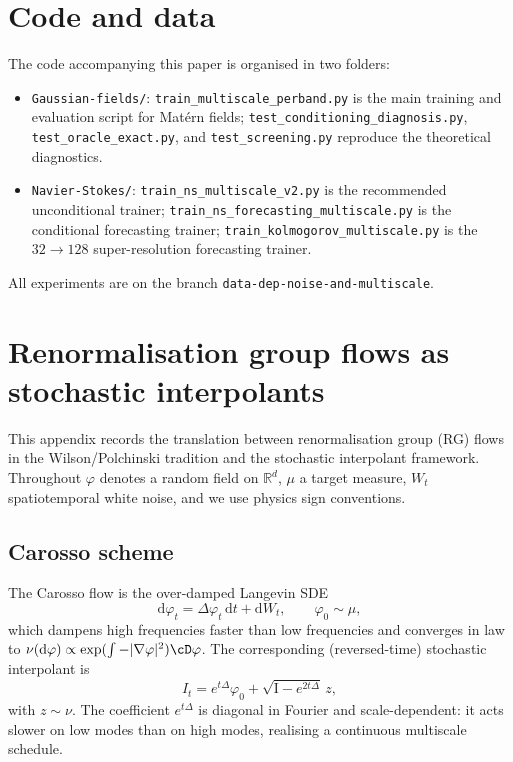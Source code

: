 \documentclass[11pt]{amsart}
\newcommand{\bR}{\mathbb{R}} \newcommand{\bN}{\mathbb{N}}
\newcommand{\rd}{\mathrm{d}}
\theoremstyle{remark}
\numberwithin{equation}{section}
\begin{document}
\section*{Code and data}
The code accompanying this paper is organised in two folders:
\begin{itemize}
\item \texttt{Gaussian-fields/}: \texttt{train\_multiscale\_perband.py} is the main training and evaluation script for Mat\'ern fields; \texttt{test\_conditioning\_diagnosis.py}, \texttt{test\_oracle\_exact.py}, and \texttt{test\_screening.py} reproduce the theoretical diagnostics.
\item \texttt{Navier-Stokes/}: \texttt{train\_ns\_multiscale\_v2.py} is the recommended unconditional trainer; \texttt{train\_ns\_forecasting\_multiscale.py} is the conditional forecasting trainer; \texttt{train\_kolmogorov\_multiscale.py} is the $32\!\to\!128$ super-resolution forecasting trainer.
\end{itemize}
All experiments are on the branch \texttt{data-dep-noise-and-multiscale}.

\appendix
\section{Renormalisation group flows as stochastic interpolants}
\label{app:rg}
This appendix records the translation between renormalisation group (RG) flows in the Wilson/Polchinski tradition and the stochastic interpolant framework. Throughout $\varphi$ denotes a random field on $\bR^d$, $\mu$ a target measure, $W_t$ spatiotemporal white noise, and we use physics sign conventions.

\subsection{Carosso scheme}
The Carosso flow is the over-damped Langevin SDE
\begin{equation}
 \rd\varphi_t = \Delta\varphi_t\,\rd t + \rd W_t,\qquad \varphi_0\sim\mu,
\end{equation}
which dampens high frequencies faster than low frequencies and converges in law to $\nu(\rd\varphi)\propto\exp(\int -|\nabla\varphi|^2)\cD\varphi$. The corresponding (reversed-time) stochastic interpolant is
\begin{equation}
 I_t = e^{t\Delta}\varphi_0 + \sqrt{\mathrm{I}-e^{2t\Delta}}\,z,
\end{equation}
with $z\sim\nu$. The coefficient $e^{t\Delta}$ is diagonal in Fourier and scale-dependent: it acts slower on low modes than on high modes, realising a continuous multiscale schedule.
\end{document}
